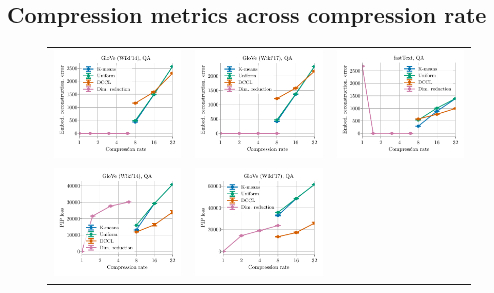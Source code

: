 \subsection{Compression metrics across compression rate}
\begin{figure}
	\footnotesize
	\centering
	\begin{tabular}{@{\hskip -0.0in}c@{\hskip -0.0in}c@{\hskip -0.0in}c@{\hskip -0.0in}}
		\includegraphics[width=.245\linewidth]{figures/glove400k_synthetics_embed-frob-error_vs_compression_linx_det.pdf} &
		\includegraphics[width=.245\linewidth]{figures/glove-wiki400k-am_synthetics_embed-frob-error_vs_compression_linx_det.pdf} &
		\includegraphics[width=.245\linewidth]{figures/fasttext1m_synthetics_embed-frob-error_vs_compression_linx_det.pdf}	\\
		\includegraphics[width=.245\linewidth]{figures/glove400k_synthetics-large-dim_gram-large-dim-frob-error_vs_compression_linx_det.pdf} &
		\includegraphics[width=.245\linewidth]{figures/glove-wiki400k-am_synthetics-large-dim_gram-large-dim-frob-error_vs_compression_linx_det.pdf} &

\end{tabular}
\end{figure}
